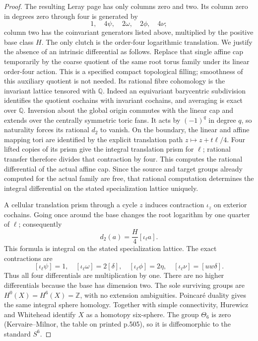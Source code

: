 \begin{proof}
The resulting Leray page has only columns zero and two. Its column zero in degrees zero through four is generated by \[
 1,\quad4\psi,\quad2\omega,\quad2\phi,\quad4\nu;
\] column two has the coinvariant generators listed above, multiplied by the positive base class \(H\). The only clutch is the order-four logarithmic translation. We justify the absence of an intrinsic differential as follows. Replace that single affine cap temporarily by the coarse quotient of the same root torus family under its linear order-four action. This is a specified compact topological filling; smoothness of this auxiliary quotient is not needed. Its rational fibre cohomology is the invariant lattice tensored with \(\mathbb Q\). Indeed an equivariant barycentric subdivision identifies the quotient cochains with invariant cochains, and averaging is exact over \(\mathbb Q\). Inversion about the global origin commutes with the linear cap and extends over the centrally symmetric toric fans. It acts by \((-1)^q\) in degree \(q\), so naturality forces its rational \(d_2\) to vanish. On the boundary, the linear and affine mapping tori are identified by the explicit translation path \(z\mapsto z+t\ell/4\). Four lifted copies of its prism give the integral translation prism for \(\ell\); rational transfer therefore divides that contraction by four. This computes the rational differential of the actual affine cap. Since the source and target groups already computed for the actual family are free, that rational computation determines the integral differential on the stated specialization lattice uniquely.

A cellular translation prism through a cycle \(z\) induces contraction \(\iota_z\) on exterior cochains. Going once around the base changes the root logarithm by one quarter of \(\ell\); consequently \[
 d_2(a)=\frac H4[\iota_\ell a].
\] This formula is integral on the stated specialization lattice. The exact contractions are \[
 [\iota_\ell\psi]=1,\quad
 [\iota_\ell\omega]=2[\delta],\quad
 [\iota_\ell\phi]=2\eta,\quad
 [\iota_\ell\nu]=[uw\delta].
\] Thus all four differentials are multiplication by one. There are no higher differentials because the base has dimension two. The sole surviving groups are \(H^0(X)=H^6(X)=\mathbb Z\), with no extension ambiguities. Poincaré duality gives the same integral sphere homology. Together with simple connectivity, Hurewicz and Whitehead identify \(X\) as a homotopy six-sphere. The group \(\Theta _6\) is zero (Kervaire--Milnor, the table on printed p.505), so it is diffeomorphic to the standard \(S^6\).


\end{proof}
